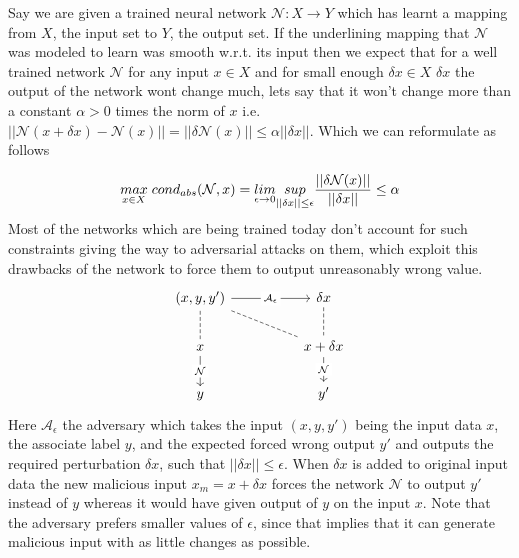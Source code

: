  \label{problem_defense_adv_nn_attack}

Say we are given a trained neural network $\mathcal{N}: X \to Y$ which has learnt a mapping from $X$, the input set to $Y$, the output set. If the underlining mapping that $\mathcal{N}$ was modeled to learn was smooth w.r.t. its input then we expect that for a well trained network $\mathcal{N}$ for any input $x\in X$ and for small enough $\delta x \in X$  $\delta x$ the output of the network wont change much, lets say that it won't change more than a constant $\alpha > 0$ times the norm of $x$ i.e. $||\mathcal{N}(x+\delta x) - \mathcal{N}(x)|| = ||\delta \mathcal{N}(x)||\le \alpha ||\delta x||$. Which we can reformulate as follows

\begin{equation}
    \underset{x\in X}{max}\hspace{1mm} cond_{abs}(\mathcal{N},x) = \underset{\epsilon \to 0}{lim}\underset{||\delta x||\le \epsilon}{sup} \frac{||\delta \mathcal{N}(x)||}{||\delta x||} \le \alpha
\end{equation}\newline 
Most of the networks which are being trained today don't account for such constraints giving the way to adversarial attacks on them, which exploit this drawbacks of the network to force them to output unreasonably wrong value.
\begin{equation}
\begin{tikzcd}
{(x,y,y')} \arrow[rr, "\mathcal{A}_{\epsilon}" description] \arrow[rrd, no head, dashed] \arrow[d, no head, dashed] &  & \delta x \arrow[d, no head, dashed]\\
x \arrow[d, "\mathcal{N}" description] &  & x+\delta x \arrow[d, "\mathcal{N}" description] \\
y& & y'
\end{tikzcd}
\end{equation}\newline
Here $\mathcal{A}_{\epsilon}$ the adversary which takes the input $(x,y,y')$ being the input data $x$, the associate label $y$, and the expected forced wrong output $y'$ and outputs the required perturbation $\delta x$, such that $||\delta x|| \le \epsilon$. When $\delta x$ is added to original input data the new malicious input $x_m = x + \delta x$ forces the network $\mathcal{N}$ to output $y'$ instead of $y$ whereas it would have given output of $y$ on the input $x$. Note that the adversary prefers smaller values of $\epsilon$, since that implies that it can generate malicious input with as little changes as possible.\newline
